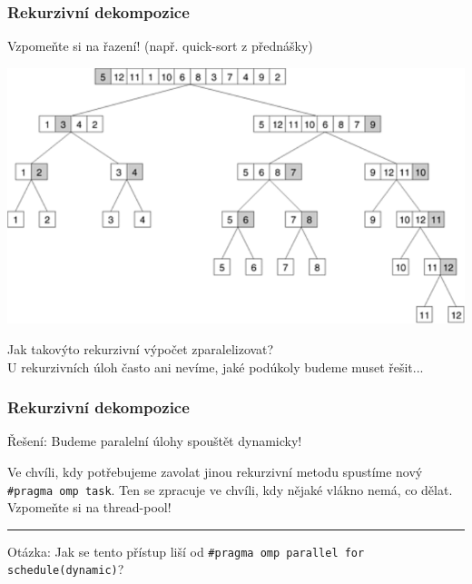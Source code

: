 \documentclass[usenames,dvipsnames,9pt]{beamer}
\begin{document}
\begin{frame}[fragile]
	\frametitle{Rekurzivní dekompozice}


	\hfill Vzpomeňte si na řazení! (např. quick-sort z přednášky)

	\begin{05/figure}
		\centering\includegraphics[width=0.7\linewidth]{05/figs/quicksort.png}
	\end{05/figure}

	\pause\vspace{2em}

	\begin{center}
		{\Large Jak takovýto rekurzivní výpočet zparalelizovat?}\\
		U rekurzivních úloh často ani nevíme, jaké podúkoly budeme muset řešit...
	\end{center}
\end{frame}

\begin{frame}
	\frametitle{Rekurzivní dekompozice}

	{\Large Řešení: Budeme paralelní úlohy spouštět dynamicky!}

	\hfill\begin{minipage}{0.8\linewidth}
	  Ve chvíli, kdy potřebujeme zavolat jinou rekurzivní metodu spustíme nový \texttt{\#pragma omp task}.
	  Ten se zpracuje ve chvíli, kdy nějaké vlákno nemá, co dělat.
	  Vzpomeňte si na thread-pool!
  \end{minipage}

  \pause
  \vspace{2em}\hrule\vspace{2em}

  Otázka: Jak se tento přístup liší od \texttt{\#pragma omp parallel for schedule(dynamic)}?
\end{frame}
\end{document}
